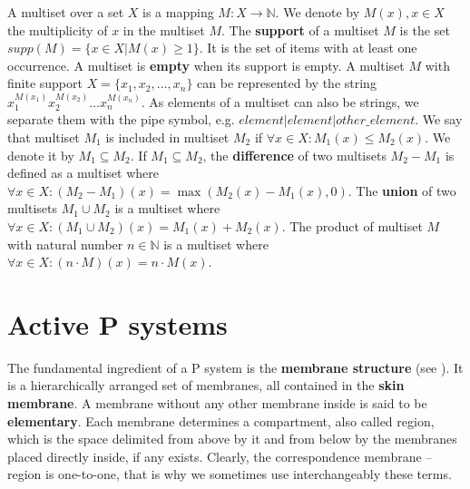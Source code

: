 \documentclass[llncs,submission,copyright,creativecommons]{../lib/lncs/llncs}
\begin{document}
A multiset over a set $X$ is a mapping $M: X\rightarrow \mathbb N$.
We denote by $M(x), x\in X$ the multiplicity of $x$ in the multiset $M$.
The {\bf support} of a multiset $M$ is the set $supp(M)=\{x\in X|M(x)\geq 1\}$.
It is the set of items with at least one occurrence.
A multiset is {\bf empty} when its support is empty.
A multiset $M$ with finite support $X = \{x_1, x_2, \dots, x_n\}$ can be represented by the string $x_1^{M(x_1)}x_2^{M(x_2)}\dots x_n^{M(x_n)}$.
As elements of a multiset can also be strings, we separate them with the pipe symbol, e.g. $element|element|other\_element$.
We say that multiset $M_1$ is included in multiset $M_2$ if $\forall x \in X: M_1(x)\leq M_2(x)$.
We denote it by $M_1\subseteq M_2$.
If $M_1\subseteq M_2$, the {\bf difference} of two multisets $M_2-M_1$ is defined as a multiset where $\forall x \in X: (M_2-M_1)(x)=\max(M_2(x)-M_1(x),0)$.
The {\bf union} of two multisets $M_1\cup M_2$ is a multiset where $\forall x \in X: (M_1\cup M_2)(x)=M_1(x)+M_2(x)$.
The product of multiset $M$ with natural number $n\in \mathbb N$ is a multiset where $\forall x \in X: (n\cdot M)(x)=n\cdot M(x)$.
  
\section{Active P systems}
\label{sec:p systems}



The fundamental ingredient of a P system is the {\bf membrane structure} (see \cite{Paun2006Introduction}). It is a hierarchically arranged set of membranes, all contained in the {\bf skin membrane}. A membrane without any other membrane inside is said to be {\bf elementary}. Each membrane determines a compartment, also called region, which is the space delimited from above by it and from below by the membranes placed directly inside, if any exists. Clearly, the correspondence membrane – region is one-to-one, that is why we sometimes use interchangeably these terms.

\end{document}
